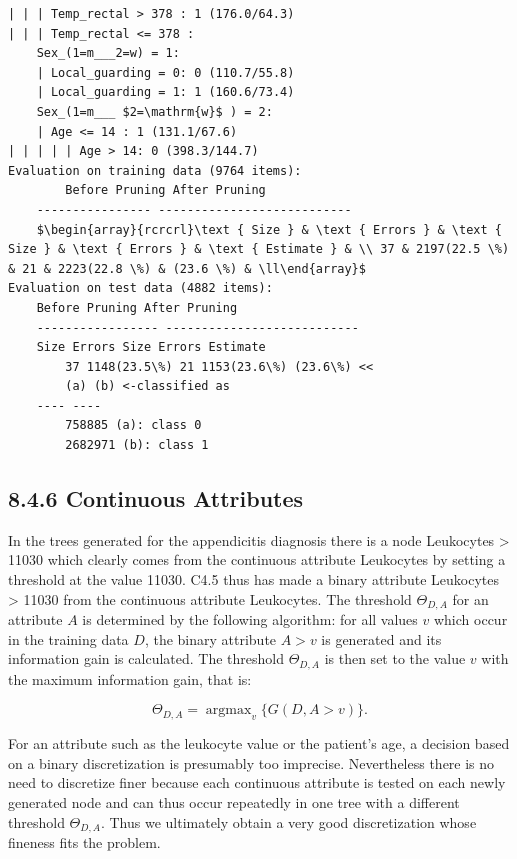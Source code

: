 \documentclass[10pt]{book}
\begin{document}
\begin{center}
\begin{enumerate}
\begin{center}
\begin{center}
\begin{verbatim}
| | | Temp_rectal > 378 : 1 (176.0/64.3)
| | | Temp_rectal <= 378 :
    Sex_(1=m___2=w) = 1:
    | Local_guarding = 0: 0 (110.7/55.8)
    | Local_guarding = 1: 1 (160.6/73.4)
    Sex_(1=m___ $2=\mathrm{w}$ ) = 2:
    | Age <= 14 : 1 (131.1/67.6)
| | | | | Age > 14: 0 (398.3/144.7)
Evaluation on training data (9764 items):
        Before Pruning After Pruning
    ---------------- ---------------------------
    $\begin{array}{rcrcrl}\text { Size } & \text { Errors } & \text { Size } & \text { Errors } & \text { Estimate } & \\ 37 & 2197(22.5 \%) & 21 & 2223(22.8 \%) & (23.6 \%) & \ll\end{array}$
Evaluation on test data (4882 items):
    Before Pruning After Pruning
    ----------------- ---------------------------
    Size Errors Size Errors Estimate
        37 1148(23.5\%) 21 1153(23.6\%) (23.6\%) <<
        (a) (b) <-classified as
    ---- ----
        758885 (a): class 0
        2682971 (b): class 1
\end{verbatim}

\subsection*{8.4.6 Continuous Attributes}
In the trees generated for the appendicitis diagnosis there is a node Leukocytes > 11030 which clearly comes from the continuous attribute Leukocytes by setting a threshold at the value 11030. C4.5 thus has made a binary attribute Leukocytes > 11030 from the continuous attribute Leukocytes. The threshold $\Theta_{D, A}$ for an attribute $A$ is determined by the following algorithm: for all values $v$ which occur in the training data $D$, the binary attribute $A>v$ is generated and its information gain is calculated. The threshold $\Theta_{D, A}$ is then set to the value $v$ with the maximum information gain, that is:

$$
\Theta_{D, A}=\operatorname{argmax}_{v}\{G(D, A>v)\} .
$$

For an attribute such as the leukocyte value or the patient's age, a decision based on a binary discretization is presumably too imprecise. Nevertheless there is no need to discretize finer because each continuous attribute is tested on each newly generated node and can thus occur repeatedly in one tree with a different threshold $\Theta_{D, A}$. Thus we ultimately obtain a very good discretization whose fineness fits the problem.


\end{center}
\end{center}
\end{enumerate}
\end{center}
\end{document}
